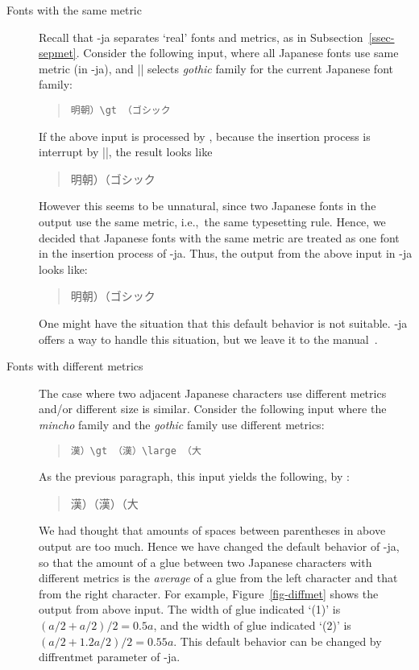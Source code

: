 \documentclass{ajt}
\begin{document}
\begin{description}
\item[Fonts with the same metric]
Recall that \LuaTeX-ja separates `real' fonts and metrics, as in Subsection~\ref{ssec-sepmet}. 
Consider the following input, where all Japanese fonts use same metric
	   (in \LuaTeX-ja), and |\gt| selects \emph{gothic} family for
	   the current Japanese font family:
\begin{quote}
\begin{verbatim}
明朝）\gt （ゴシック
\end{verbatim}
\end{quote}
If the above input is processed by \pTeX, because the insertion process is
	   interrupt by |\gt|, the result looks like
\begin{quote}
\mc 明朝）\hbox{}\gt （ゴシック
\end{quote}
However this seems to be unnatural, since two Japanese fonts in the
	   output use the same metric, i.e.,~the same
	   typesetting rule.  Hence, we decided that Japanese fonts with
	   the same metric are treated as one font in the insertion
	   process of \LuaTeX-ja. Thus, the output from the above input
	   in \LuaTeX-ja looks like:
\begin{quote}
\mc 明朝）\gt （ゴシック
\end{quote}
One might have the situation that this default behavior is not
	   suitable. \LuaTeX-ja offers a way to handle this situation, but
	   we leave it to the manual~\cite{man}.

\item[Fonts with different metrics] 
The case where two adjacent Japanese characters use different metrics
	   and/or different size is similar. Consider the following
	   input where the \emph{mincho} family and the \emph{gothic}
	   family use different metrics:
\begin{quote}
\begin{verbatim}
漢）\gt （漢）\large （大
\end{verbatim}
\end{quote}
As the previous paragraph, this input yields the following, by \pTeX:
\begin{quote}
\mc 漢）\hbox{}\gt （漢）\hbox{}\large （大
\end{quote}
We had thought that amounts of spaces between parentheses in above output
	   are too much. Hence we have changed the default behavior of
	   \LuaTeX-ja, so that the amount of a glue between two Japanese
	   characters with different metrics is the \emph{average} of a glue
	   from the left character and that from the right
	   character. For example, Figure~\ref{fig-diffmet} shows the
	   output from above input. The width of glue indicated `(1)' is
	   $(a/2 + a/2)/2 = 0.5a$, and the width of glue indicated `(2)'
	   is $(a/2 + 1.2a/2)/2 = 0.55a$. This default behavior can be
	   changed by \textsf{diffrentmet} parameter of \LuaTeX-ja.


\end{description}
\end{document}
